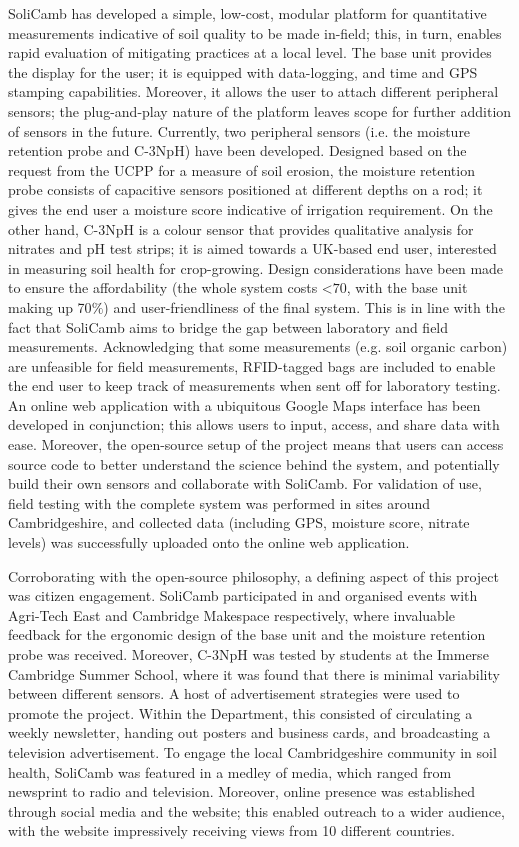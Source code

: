 SoliCamb has developed a simple, low-cost, modular platform for quantitative measurements indicative of soil quality to be made in-field; this, in turn, enables rapid evaluation of mitigating practices at a local level. The base unit provides the display for the user; it is equipped with data-logging, and time and GPS stamping capabilities. Moreover, it allows the user to attach different peripheral sensors; the plug-and-play nature of the platform leaves scope for further addition of sensors in the future. Currently, two peripheral sensors (i.e. the moisture retention probe and C-3NpH) have been developed. Designed based on the request from the \gls{UCPP} for a measure of soil erosion, the moisture retention probe consists of capacitive sensors positioned at different depths on a rod; it gives the end user a moisture score indicative of irrigation requirement. On the other hand, C-3NpH is a colour sensor that provides qualitative analysis for nitrates and pH test strips; it is aimed towards a UK-based end user, interested in measuring soil health for crop-growing. Design considerations have been made to ensure the affordability (the whole system costs <\textsterling$70$, with the base unit making up 70$\%$) and user-friendliness of the final system. This is in line with the fact that SoliCamb aims to bridge the gap between laboratory and field measurements.  Acknowledging that some measurements (e.g. soil organic carbon) are unfeasible for field measurements, RFID-tagged bags are included to enable the end user to keep track of measurements when sent off for laboratory testing. An online web application with a ubiquitous Google Maps interface has been developed in conjunction; this allows users to input, access, and share data with ease.  Moreover, the open-source setup of the project means that users can access source code to better understand the science behind the system, and potentially build their own sensors and collaborate with SoliCamb. For validation of use, field testing with the complete system was performed in sites around Cambridgeshire, and collected data (including GPS, moisture score, nitrate levels) was successfully uploaded onto the online web application. 

Corroborating with the open-source philosophy, a defining aspect of this project was citizen engagement. SoliCamb participated in and organised events with Agri-Tech East and Cambridge Makespace respectively, where invaluable feedback for the ergonomic design of the base unit and the moisture retention probe was received. Moreover, C-3NpH was tested by students at the Immerse Cambridge Summer School, where it was found that there is minimal variability between different sensors. A host of advertisement strategies were used to promote the project. Within the Department, this consisted of circulating a weekly newsletter, handing out posters and business cards, and broadcasting a television advertisement. To engage the local Cambridgeshire community in soil health, SoliCamb was featured in a medley of media, which ranged from newsprint to radio and television. Moreover, online presence was established through social media and the website; this enabled outreach to a wider audience, with the website impressively receiving views from 10 different countries. 

